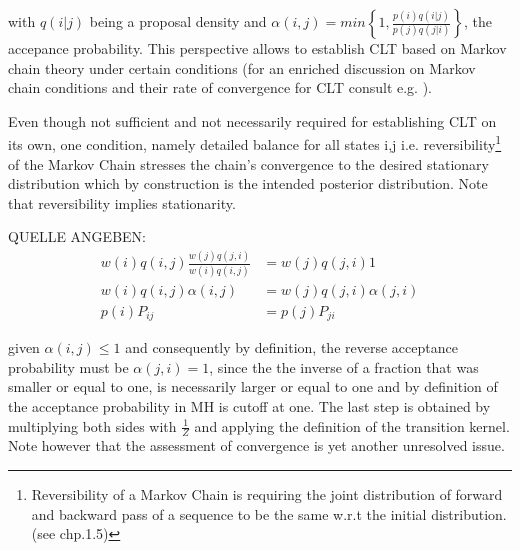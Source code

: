 \documentclass[11pt]{article}
\begin{document}
        with $q(i|j)$ being a proposal density and $\alpha(i,j) = min\left\{1, \frac{p(i)q(i|j)}{p(j)q(j|i)} \right\}$, the accepance probability. This perspective allows to establish CLT based on Markov chain theory under certain conditions (for an enriched discussion on Markov chain conditions and their rate of convergence for CLT consult e.g. \cite{jones2004markov}).

        Even though not sufficient and not necessarily required for establishing CLT on its own, one condition, namely detailed balance for all states i,j i.e. reversibility\footnote{Reversibility of a Markov Chain is requiring the joint distribution of forward and backward pass of a sequence to be the same w.r.t the initial distribution. (see \cite{brooks2011handbook} chp.1.5)} of the Markov Chain stresses the chain's convergence to the desired stationary distribution which by construction is the intended posterior distribution. Note that reversibility implies stationarity.

        QUELLE ANGEBEN:
        \begin{align*}
        \label{MHdetailed}
            w(i)q(i,j)\frac{w(j)q(j,i)}{w(i)q(i,j)} &= w(j)q(j,i) 1 \\
            w(i)q(i,j)\alpha(i,j) &=  w(j)q(j,i)\alpha(j,i)         \\
            p(i)P_{ij} &= p(j)P_{ji}
        \end{align*}

        given $\alpha(i,j) \leq 1$  and consequently by definition, the reverse acceptance probability must be $\alpha(j,i) = 1$, since the the inverse of a fraction that was smaller or equal to one, is necessarily larger or equal to one and by definition of the acceptance probability in MH is cutoff at one.
        The last step is obtained by multiplying both sides with $\frac{1}{Z}$ and applying the definition of the transition kernel.
        Note however that the assessment of convergence is yet another unresolved issue.

\end{document}

